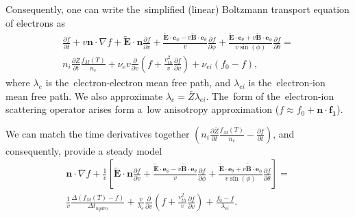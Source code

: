 \documentclass[preprint,12pt]{elsarticle}
\newcommand{\pdv}[2]{\frac{\partial{#1}}{\partial{#2}}}
\newcommand{\vect}[1]{\boldsymbol{#1}}
\newcommand{\mfpe}{\lambda_e}
\newcommand{\mfpei}{\lambda_{ei}}
\newcommand{\Zbar}{\bar{Z}}
\newcommand{\nue}{\nu_{e}}
\newcommand{\nuei}{\nu_{ei}}
\newcommand{\vmag}{v}
\newcommand{\vth}{v_{th}}
\newcommand{\vn}{\vect{n}}
\newcommand{\tE}{\vect{\tilde{E}}}
\newcommand{\tB}{\vect{\tilde{B}}}
\newcommand{\fM}{f_M}
\newcommand{\fzero}{f_0}
\newcommand{\fone}{\vect{f_1}}
\newcounter{bla}
\begin{document}
Consequently, one can write the~simplified (linear) Boltzmann transport 
equation of electrons as
\begin{multline}
  \pdv{f}{t} +
  \vmag\vn\cdot\nabla f + \tE\cdot\vn \pdv{f}{\vmag} 
  + \frac{\tE\cdot\vect{e}_\phi 
  - \vmag\tB\cdot\vect{e}_\theta}{\vmag}\pdv{f}{\phi}
  + \frac{\tE\cdot\vect{e}_\theta + \vmag\tB\cdot\vect{e}_\phi}
  {\vmag\sin(\phi)}\pdv{f}{\theta}
  =\\
  n_i \pdv{\Zbar}{t}\frac{\fM(T)}{n_e} +
  \nue\vmag\pdv{}{\vmag}\left( f + 
  \frac{\vth^2}{\vmag} \pdv{f}{\vmag}\right) 
  + \nuei\left(\fzero - f\right) ,
  \label{eq:DECO_spherical}
\end{multline}
where $\mfpe$ is the~electron-electron mean free path, and
$\mfpei$ is the~electron-ion mean free path. We also approximate
$\mfpe = \Zbar \mfpei$. The~form of the~electron-ion scattering operator
arises form a~low anisotropy approximation 
($f\approx\fzero + \vn\cdot\fone$).

We can match the time derivatives together
$\left(n_i \pdv{\Zbar}{t}\frac{\fM(T)}{n_e} - \pdv{f}{t}\right)$, 
and consequently, provide a steady model
\begin{multline}
  \vn\cdot\nabla f + \frac{1}{\vmag}\left[\tE\cdot\vn \pdv{f}{\vmag} 
  + \frac{\tE\cdot\vect{e}_\phi 
  - \vmag\tB\cdot\vect{e}_\theta}{\vmag}\pdv{f}{\phi}
  + \frac{\tE\cdot\vect{e}_\theta + \vmag\tB\cdot\vect{e}_\phi}
  {\vmag\sin(\phi)}\pdv{f}{\theta}\right]
  =\\
  \frac{1}{\vmag}\frac{\Delta\left(\fM(T) - f\right)}{\Delta t_{hydro}} +
  \frac{\vmag}{\mfpe}\pdv{}{\vmag}\left( f + 
  \frac{\vth^2}{\vmag} \pdv{f}{\vmag}\right) 
  + \frac{\fzero - f}{\mfpei} .
  \label{eq:DECO_spherical}
\end{multline}













\end{document}
